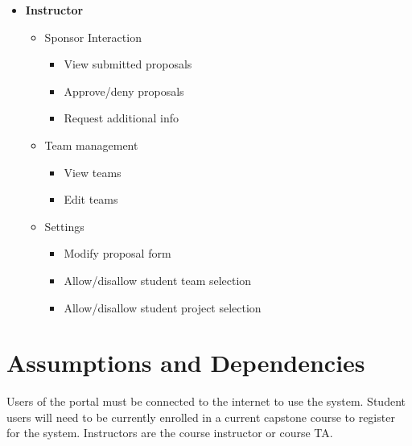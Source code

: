 \documentclass[12pt]{article}
\begin{document}
\begin{itemize}
	\item \textbf{Instructor}
	\begin{itemize}
		\item Sponsor Interaction
		\begin{itemize}
			\item View submitted proposals
			\item Approve/deny proposals
			\item Request additional info
		\end{itemize}
		\item Team management
		\begin{itemize}
			\item View teams
			\item Edit teams
		\end{itemize}
		\item Settings
		\begin{itemize}
			\item Modify proposal form
			\item Allow/disallow student team selection
			\item Allow/disallow student project selection
		\end{itemize}
	\end{itemize}
\end{itemize}

\section{Assumptions and Dependencies}
Users of the portal must be connected to the internet to use the system. Student users will need to be currently enrolled in a current capstone course to register for the system. Instructors are the course instructor or course TA.
\end{document}
